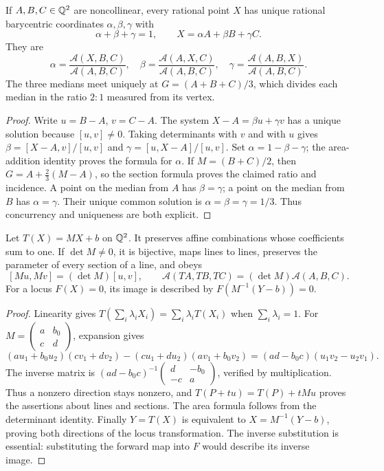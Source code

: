 \begin{theorem}
\label{geo:centroid}
If $A,B,C\in\mathbb Q^2$ are noncollinear, every rational point $X$ has unique
rational barycentric coordinates $\alpha,\beta,\gamma$ with
\[
 \alpha+\beta+\gamma=1,\qquad X=\alpha A+\beta B+\gamma C.
\]
They are
\[
 \alpha=\frac{\mathcal A(X,B,C)}{\mathcal A(A,B,C)},\quad
 \beta=\frac{\mathcal A(A,X,C)}{\mathcal A(A,B,C)},\quad
 \gamma=\frac{\mathcal A(A,B,X)}{\mathcal A(A,B,C)}.
\]
The three medians meet uniquely at $G=(A+B+C)/3$, which divides each median
in the ratio $2:1$ measured from its vertex.
\end{theorem}
\begin{proof}
Write $u=B-A$, $v=C-A$. The system $X-A=\beta u+\gamma v$ has a unique
solution because $[u,v]\ne0$. Taking determinants with $v$ and with $u$
gives $\beta=[X-A,v]/[u,v]$ and $\gamma=[u,X-A]/[u,v]$.
Set $\alpha=1-\beta-\gamma$; the area-addition identity proves the formula
for $\alpha$. If $M=(B+C)/2$, then
$G=A+\frac23(M-A)$, so the section formula proves the claimed ratio and
incidence. A point on the median from $A$ has $\beta=\gamma$; a point on
the median from $B$ has $\alpha=\gamma$. Their unique common solution is
$\alpha=\beta=\gamma=1/3$. Thus concurrency and uniqueness are both explicit.
\end{proof}

\begin{theorem}
\label{geo:affine}
Let $T(X)=MX+b$ on $\mathbb Q^2$. It preserves affine combinations whose coefficients
sum to one. If $\det M\ne0$, it is bijective, maps lines to lines, preserves
the parameter of every section of a line, and obeys
\[
 [Mu,Mv]=(\det M)[u,v],\qquad
 \mathcal A(TA,TB,TC)=(\det M)\mathcal A(A,B,C).
\]
For a locus $F(X)=0$, its image is described by
$F(M^{-1}(Y-b))=0$.
\end{theorem}
\begin{proof}
Linearity gives
$T(\sum_i\lambda_iX_i)=\sum_i\lambda_iT(X_i)$ when $\sum_i\lambda_i=1$.
For $M=\left(\begin{smallmatrix}a&b_0\\c&d\end{smallmatrix}\right)$,
expansion gives
\[
 (au_1+b_0u_2)(cv_1+dv_2)-(cu_1+du_2)(av_1+b_0v_2)
 =(ad-b_0c)(u_1v_2-u_2v_1).
\]
The inverse matrix is
$(ad-b_0c)^{-1}\left(\begin{smallmatrix}d&-b_0\\-c&a\end{smallmatrix}\right)$,
verified by multiplication. Thus a nonzero direction stays nonzero, and
$T(P+tu)=T(P)+tMu$ proves the assertions about lines and sections.
The area formula follows from the determinant identity. Finally
$Y=T(X)$ is equivalent to $X=M^{-1}(Y-b)$, proving both directions of
the locus transformation. The inverse substitution is essential: substituting
the forward map into $F$ would describe its inverse image.
\end{proof}

